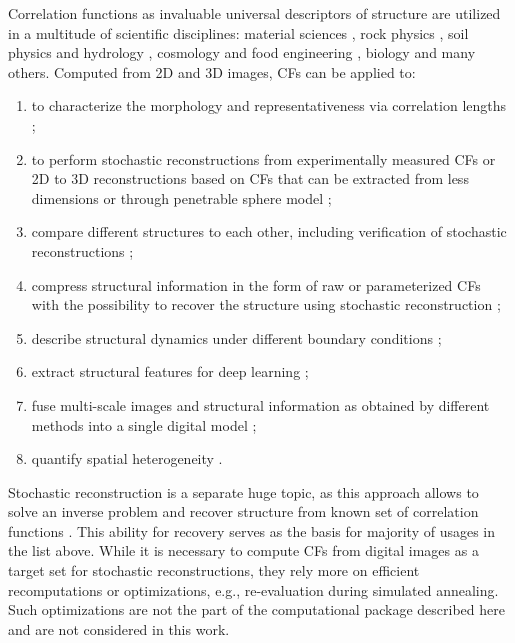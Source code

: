 \documentclass[1p]{elsarticle}
\begin{document}
Correlation functions as invaluable universal descriptors of structure are
utilized in a multitude of scientific disciplines: material sciences
\cite{hasanabadi20163d,Havelka,feng2018reconstruction,chen2022quantifying}, rock
physics \cite{ledesma2018effect}, soil physics and hydrology
\cite{PLoS_ONE,KarsaninaEJSS}, cosmology and food engineering
\cite{TakadaJain,Derossi2019}, biology \cite{veatch2012correlation} and many
others. Computed from 2D and 3D images, CFs can be applied to:
\begin{enumerate}
  \item to characterize the morphology and representativeness via correlation
    lengths \cite{vcapek2009stochastic,thovert2011grain,tensorPRE};
  \item to perform stochastic reconstructions from experimentally measured CFs
    or 2D to 3D reconstructions based on CFs that can be extracted from less
    dimensions or through penetrable sphere model
    \cite{Adler_recon,Y-T,tahmasebiPRL,hasanabadi20163d,karsaninaPRL};
  \item compare different structures to each other, including verification of
    stochastic reconstructions \cite{vcapek2009stochastic,tahmasebiPRL,EPL2};
  \item compress structural information in the form of raw or parameterized CFs
    with the possibility to recover the structure using stochastic
    reconstruction \cite{SciRep1,Havelka,KarsaninaEJSS};
  \item describe structural dynamics under different boundary conditions
    \cite{chen2015dynamic,xu2022correlation,fomin2023soil};
  \item extract structural features for deep learning
    \cite{pilania2017multi,kamrava2020linking,roding2020predicting,KarsaninaEJSS};
  \item fuse multi-scale images and structural information as obtained by
    different methods into a single digital model \cite{Geoderma2018};
  \item quantify spatial heterogeneity \cite{zhang2000pore,REVpaper}.
\end{enumerate}

Stochastic reconstruction is a separate huge topic, as this approach allows to
solve an inverse problem and recover structure from known set of correlation
functions
\cite{Adler_recon,Y-T,vcapek2009stochastic,hasanabadi20163d,Havelka,feng2018reconstruction,tahmasebiPRL,EPL2,thovert2011grain,tensorPRE}. This
ability for recovery serves as the basis for majority of usages in the list
above. While it is necessary to compute CFs from digital images as a target set
for stochastic reconstructions, they rely more on efficient recomputations or
optimizations, e.g., re-evaluation during simulated annealing. Such
optimizations are not the part of the computational package described here and
are not considered in this work.
\end{document}
